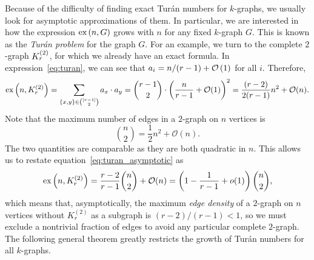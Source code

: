 Because of the difficulty of finding exact Turán numbers for $k$-graphs,
we usually look for asymptotic approximations of them.
In particular, we are interested in how the expression
$\text{ex} \left( n, G \right)$ grows with $n$ for any fixed $k$-graph $G$.
This is known as the \emph{Turán problem} for the graph $G$.
For an example, we turn to the complete $2$-graph $K^{(2)}_{r}$,
for which we already have an exact formula.
In expression~\eqref{eq:turan}, we can see that
$a_i = n/(r-1) + \mathcal{O}\left(1\right)$ for all $i$.
Therefore,
\begin{equation} \label{eq:turan_asymptotic}
    \text{ex} \left( n, K^{(2)}_{r} \right) = \sum_{\{x, y\} \in \binom{[r-1]}{2}} a_x \cdot a_y
    = \binom{r-1}{2} \cdot \left( \frac{n}{r-1} + \mathcal{O}(1) \right)^2
    = \frac{(r-2)}{2(r-1)} n^2 + \mathcal{O}(n).
\end{equation}
Note that the maximum number of edges in a $2$-graph on $n$ vertices is
\[
    \binom{n}{2} = \frac{1}{2} n^2 + \mathcal{O}(n).
\]
The two quantities are comparable as they are both quadratic in $n$.
This allows us to restate equation~\eqref{eq:turan_asymptotic} as
\begin{equation} \label{eq:turan_asymptotic_density}
    \text{ex} \left( n, K^{(2)}_{r} \right) =
    \frac{r-2}{r-1} \binom{n}{2} + \mathcal{O}(n) =
    \left(1 - \frac{1}{r-1} + o(1)\right)\binom{n}{2},
\end{equation}
which means that, asymptotically, the maximum \emph{edge density} of a $2$-graph on $n$ vertices
without $K_r^{(2)}$ as a subgraph is $(r-2)/(r-1) < 1$, so we must exclude a nontrivial fraction of edges
to avoid any particular complete $2$-graph.
The following general theorem greatly restricts the growth of Turán numbers
for all $k$-graphs.


